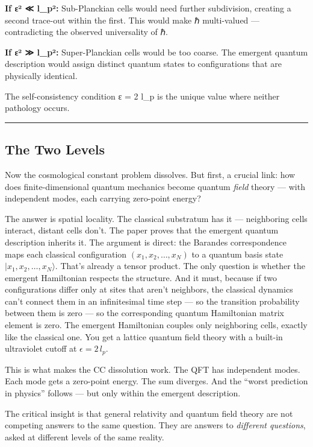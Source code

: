 \documentclass[
]{article}
\begin{document}
\textbf{If ε² ≪ l\_p²:} Sub-Planckian cells would need further
subdivision, creating a second trace-out within the first. This would
make ℏ multi-valued --- contradicting the observed universality of ℏ.

\textbf{If ε² ≫ l\_p²:} Super-Planckian cells would be too coarse. The
emergent quantum description would assign distinct quantum states to
configurations that are physically identical.

The self-consistency condition ε = 2 l\_p is the unique value where
neither pathology occurs.

\begin{center}\rule{0.5\linewidth}{0.5pt}\end{center}

\hypertarget{the-two-levels}{%
\subsection{The Two Levels}\label{the-two-levels}}

Now the cosmological constant problem dissolves. But first, a crucial
link: how does finite-dimensional quantum mechanics become quantum
\emph{field} theory --- with independent modes, each carrying zero-point
energy?

The answer is spatial locality. The classical substratum has it ---
neighboring cells interact, distant cells don't. The paper proves that
the emergent quantum description inherits it. The argument is direct:
the Barandes correspondence maps each classical configuration
\((x_1, x_2, \ldots, x_N)\) to a quantum basis state
\(|x_1, x_2, \ldots, x_N\rangle\). That's already a tensor product. The
only question is whether the emergent Hamiltonian respects the
structure. And it must, because if two configurations differ only at
sites that aren't neighbors, the classical dynamics can't connect them
in an infinitesimal time step --- so the transition probability between
them is zero --- so the corresponding quantum Hamiltonian matrix element
is zero. The emergent Hamiltonian couples only neighboring cells,
exactly like the classical one. You get a lattice quantum field theory
with a built-in ultraviolet cutoff at \(\epsilon = 2\,l_p\).

This is what makes the CC dissolution work. The QFT has independent
modes. Each mode gets a zero-point energy. The sum diverges. And the
``worst prediction in physics'' follows --- but only within the emergent
description.

The critical insight is that general relativity and quantum field theory
are not competing answers to the same question. They are answers to
\emph{different questions}, asked at different levels of the same
reality.
\end{document}

